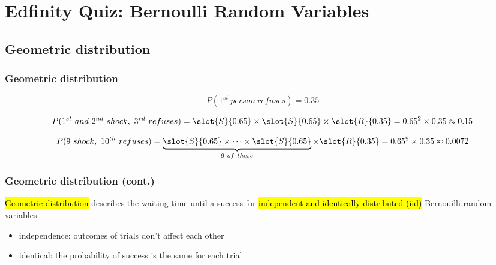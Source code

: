 \documentclass[slidestop,compress,mathserif]{beamer}
\newcommand{\soln}[1]{\textit{#1}}
\begin{document}
\section{Edfinity Quiz: Bernoulli Random Variables}


\subsection{Geometric distribution}


\begin{frame}
\frametitle{Geometric distribution}

{\small


\[ P(1^{st}~person~refuses) = 0.35 \]

\pause

\[ P(1^{st}~and~2^{nd}~shock,~3^{rd}~refuses) = \slot{S}{0.65} \times \slot{S}{0.65} \times  \slot{R}{0.35} = 0.65^2 \times 0.35 \approx 0.15 \]

\pause

\soln{
\pause
\[ P(9~shock,~10^{th}~refuses) = \underbrace{\slot{S}{0.65} \times \cdots \times \slot{S}{0.65}}_{9~of~these} \times  \slot{R}{0.35} = 0.65^9 \times 0.35 \approx 0.0072 \]
}
}

\end{frame}


\begin{frame}
\frametitle{Geometric distribution (cont.)}

\hl{Geometric distribution} describes the waiting time until a success for \hl{independent and identically distributed (iid)} Bernouilli random variables.
\begin{itemize}
\item independence: outcomes of trials don't affect each other
\item identical: the probability of success is the same for each trial
\end{itemize}

$\:$ \\
$\:$ \\

\pause


\end{frame}
\end{document}
